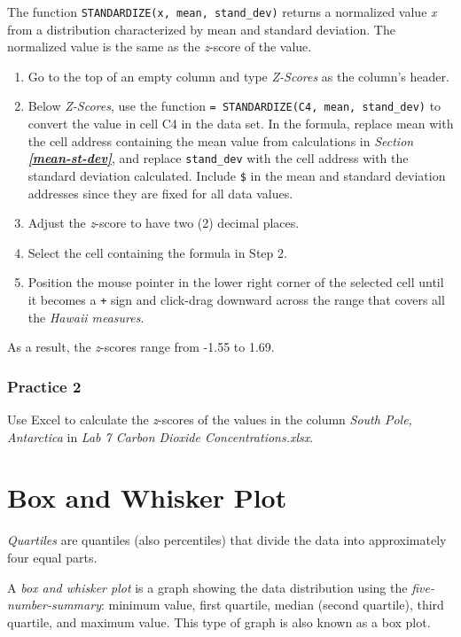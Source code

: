 \documentclass[
  12pt,
  letterpaper,
]{book}
\providecommand{\tightlist}{%
  \setlength{\itemsep}{0pt}\setlength{\parskip}{0pt}}
\begin{document}
The function \texttt{STANDARDIZE(x,\ mean,\ stand\_dev)} returns a normalized value \emph{x} from a distribution characterized by mean and standard deviation. The normalized value is the same as the \emph{z}-score of the value.

\begin{enumerate}
\def\labelenumi{\arabic{enumi}.}
\tightlist
\item
  Go to the top of an empty column and type \emph{Z-Scores} as the column's header.
\item
  Below \emph{Z-Scores}, use the function \texttt{=\ STANDARDIZE(C4,\ mean,\ stand\_dev)} to convert the value in cell C4 in the data set. In the formula, replace mean with the cell address containing the mean value from calculations in \emph{Section} \textbf{\emph{\ref{mean-st-dev}}}, and replace \texttt{stand\_dev} with the cell address with the standard deviation calculated. Include \texttt{\$} in the mean and standard deviation addresses since they are fixed for all data values.
\item
  Adjust the \emph{z}-score to have two (2) decimal places.
\item
  Select the cell containing the formula in Step 2.
\item
  Position the mouse pointer in the lower right corner of the selected cell until it becomes a \texttt{+} sign and click-drag downward across the range that covers all the \emph{Hawaii measures}.
\end{enumerate}

As a result, the \emph{z}-scores range from -1.55 to 1.69.

\hypertarget{practice-2-5}{%
\subsection{Practice 2}\label{practice-2-5}}

Use Excel to calculate the \emph{z}-scores of the values in the column \emph{South Pole, Antarctica} in \emph{Lab 7 Carbon Dioxide Concentrations.xlsx}.

\hypertarget{box-and-whisker-plot}{%
\chapter{Box and Whisker Plot}\label{box-and-whisker-plot}}

\emph{Quartiles} are quantiles (also percentiles) that divide the data into approximately four equal parts.

A \emph{box and whisker plot} is a graph showing the data distribution using the \emph{five-number-summary}: minimum value, first quartile, median (second quartile), third quartile, and maximum value. This type of graph is also known as a box plot.
\end{document}
